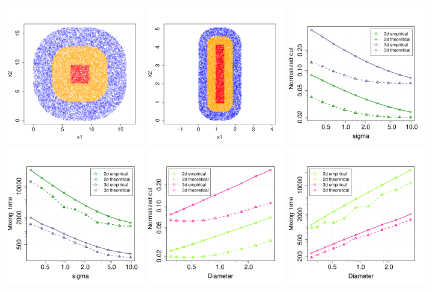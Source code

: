 \documentclass[11pt,twoside]{article}
\theoremstyle{definition}
\newcommand{\1}{\mathbbm{1}}
\begin{document}
\begin{figure}[tb]
  \centering
  \includegraphics[width=0.32\textwidth]{sample2}
  \includegraphics[width=0.32\textwidth]{sample1}
  \includegraphics[width=0.32\textwidth]{sigma_normalized_cut_plot}
  \includegraphics[width=0.32\textwidth]{sigma_mixing_time_plot}
  \includegraphics[width=0.32\textwidth]{diameter_normalized_cut_plot}
  \includegraphics[width=0.32\textwidth]{diameter_mixing_time_plot}

\end{figure}
\end{document}
